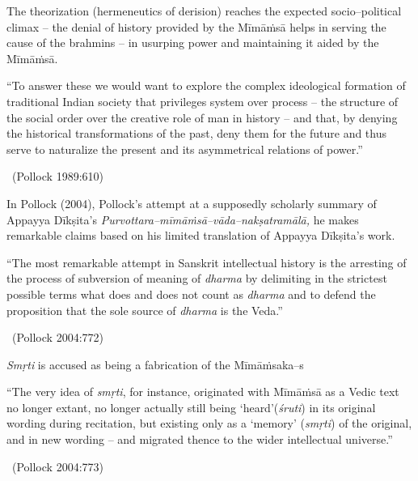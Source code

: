 The theorization (hermeneutics of derision) reaches the expected socio–political climax – the denial of history provided by the Mīmāṁsā helps in serving the cause of the brahmins – in usurping power and maintaining it aided by the Mīmāṁsā.

\smallskip

\begin{myquote}
“To answer these we would want to explore the complex ideological formation of traditional Indian society that privileges system over process – the structure of the social order over the creative role of man in history – and that, by denying the historical transformations of the past, deny them for the future and thus serve to naturalize the present and its asymmetrical relations of power.”

~\hfill (Pollock 1989:610)
\end{myquote}

\smallskip

In Pollock (2004), Pollock’s attempt at a supposedly scholarly summary of Appayya Dīkṣita’s \textit{Purvottara–mīmāṁsā–vāda–nakṣatramālā,} he makes remarkable claims based on his limited translation of Appayya Dīkṣita’s work.

\smallskip

\begin{myquote}
“The most remarkable attempt in Sanskrit intellectual history is the arresting of the process of subversion of meaning of \textit{dharma} by delimiting in the strictest possible terms what does and does not count as \textit{dharma} and to defend the proposition that the sole source of \textit{dharma} is the Veda.”

~\hfill (Pollock 2004:772)
\end{myquote}

\smallskip

\textit{Smṛti} is accused as being a fabrication of the Mīmāṁsaka–s

\smallskip

\begin{myquote}
“The very idea of \textit{smṛti}, for instance, originated with Mīmāṁsā as a Vedic text no longer extant, no longer actually still being ‘heard’(\textit{śruti}) in its original wording during recitation, but existing only as a ‘memory’ (\textit{smṛti}) of the original, and in new wording – and migrated thence to the wider intellectual universe.”

~\hfill (Pollock 2004:773)
\end{myquote}

